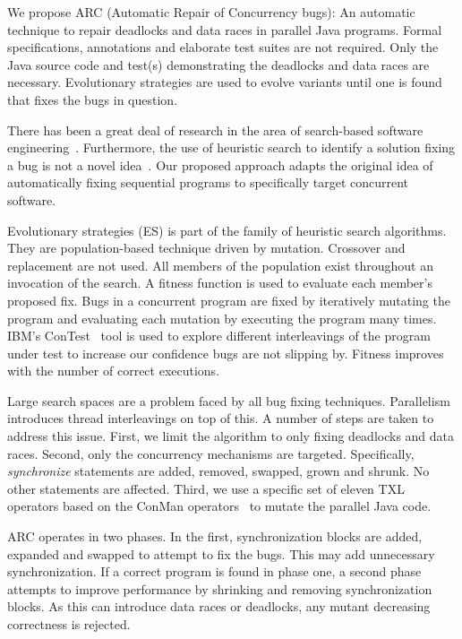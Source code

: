 \documentclass[10pt, conference, compsocconf]{IEEEtran}
\begin{document}
We propose ARC (Automatic Repair of Concurrency bugs): An automatic technique
to repair deadlocks and data races in parallel Java programs. Formal
specifications, annotations and elaborate test suites are not required. Only
the Java source code and test(s) demonstrating the deadlocks and data races are
necessary. Evolutionary strategies are used to evolve variants until one is
found that fixes the bugs in question.

There has been a great deal of research in the area of search-based software
engineering~\cite{Har+10}. Furthermore, the use of heuristic search to identify
a solution fixing a bug is not a novel idea~\cite{FNWG09, AY08, Arc08, WT10,
WNLF09, WFGN10}. Our proposed approach adapts the original idea of
automatically fixing sequential programs to specifically target concurrent
software.

Evolutionary strategies (ES) is part of the family of heuristic search
algorithms. They are population-based technique driven by mutation. Crossover
and replacement are not used.  All members of the population exist throughout
an invocation of the search. A fitness function is used to evaluate each
member's proposed fix. Bugs in a concurrent program are fixed by iteratively
mutating the program and evaluating each mutation by executing the program many
times. IBM's ConTest~\cite{EFN+02} tool is used to explore different interleavings
of the program under test to increase our confidence bugs are not slipping by.
Fitness improves with the number of correct executions.

Large search spaces are a problem faced by all bug fixing techniques.
Parallelism introduces thread interleavings on top of this. A number of steps
are taken to address this issue.  First, we limit the algorithm to only fixing
deadlocks and data races. Second, only the concurrency mechanisms are targeted.
Specifically, \textit{synchronize} statements are added, removed, swapped,
grown and shrunk. No other statements are affected. Third, we use a specific
set of eleven TXL~\cite{CHP91} operators based on the ConMan
operators~\cite{BCD06} to mutate the parallel Java code.

ARC operates in two phases. In the first, synchronization blocks are added,
expanded and swapped to attempt to fix the bugs. This may add unnecessary
synchronization. If a correct program is found in phase one, a second phase
attempts to improve performance by shrinking and removing synchronization
blocks. As this can introduce data races or deadlocks, any mutant
decreasing correctness is rejected.
\end{document}
